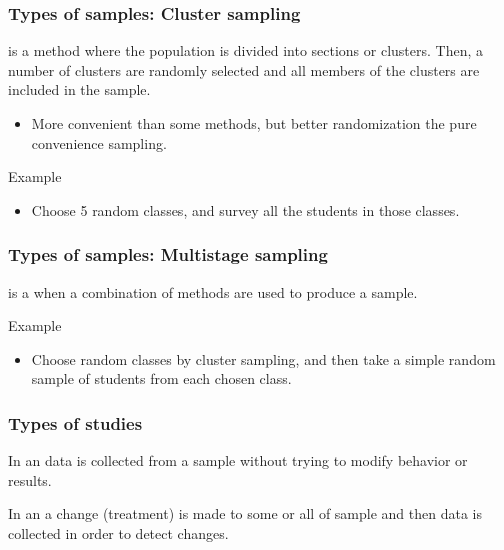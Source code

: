 \documentclass[xcolor=table, aspectratio=169, bigger]{beamer}
\begin{document}
\begin{frame}
\frametitle{Types of samples: Cluster sampling}

\begin{block}{}
 is a method where the population is divided into sections or clusters. Then, a number of clusters are randomly selected and all members of the clusters are included in the sample.
\begin{itemize}
\item More convenient than some methods, but better randomization the pure convenience sampling.
\end{itemize}
\end{block}
\pause
\begin{exampleblock}{Example}
\begin{itemize}
\item Choose 5 random classes, and survey all the students in those classes.
\end{itemize}
\end{exampleblock}
\end{frame}

\begin{frame}
\frametitle{Types of samples: Multistage sampling}

\begin{block}{}
 is a when a combination of methods are used to produce a sample.
\end{block}
\pause
\begin{exampleblock}{Example}
\begin{itemize}
\item Choose random classes by cluster sampling, and then take a simple random sample of students from each chosen class.  
\end{itemize}
\end{exampleblock}
\end{frame}

\begin{frame}
\frametitle{Types of studies}

\begin{block}{}
In an  data is collected from a sample without trying to modify behavior or results. 
\end{block}
\pause
\begin{block}{}
In an  a change (treatment) is made to some or all of sample and then data is collected in order to detect changes. 
\end{block}

\end{frame}
\end{document}
